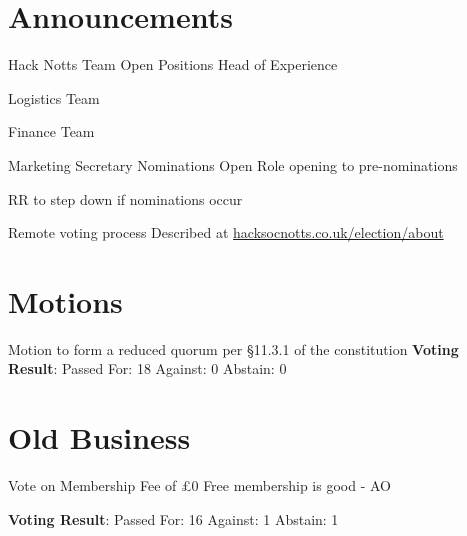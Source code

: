 \documentclass[11pt,hacksoc]{meetingmins}
\begin{document}
\maketitle

\section{Announcements}
\begin{items}
	\item
	Hack Notts Team Open Positions
		\subitem
		Head of Experience
		
		\subitem
		Logistics Team
		
		\subitem
		Finance Team
		
	\item
	Marketing Secretary Nominations Open
		\subitem
		Role opening to pre-nominations
		
		\subitem
		RR to step down if nominations occur
		
	\item
	Remote voting process
		\subitem
		Described at \href{https://hacksocnotts.co.uk/election/about}{hacksocnotts.co.uk/election/about}
\end{items}

\section{Motions}
\begin{items}
	\item
	Motion to form a reduced quorum per \S 11.3.1 of the constitution
	\subitem
		\textbf{Voting Result}: Passed
			\subsubitem
			For: 18
			\subsubitem
			Against: 0
			\subsubitem
			Abstain: 0
\end{items}


\section{Old Business}
\begin{items}
	\item
	Vote on Membership Fee of \pounds0
		\subitem
		Free membership is good - AO
		
		\subitem
		\textbf{Voting Result}: Passed
			\subsubitem
			For: 16
			\subsubitem
			Against: 1
			\subsubitem
			Abstain: 1
\end{items}
\end{document}
